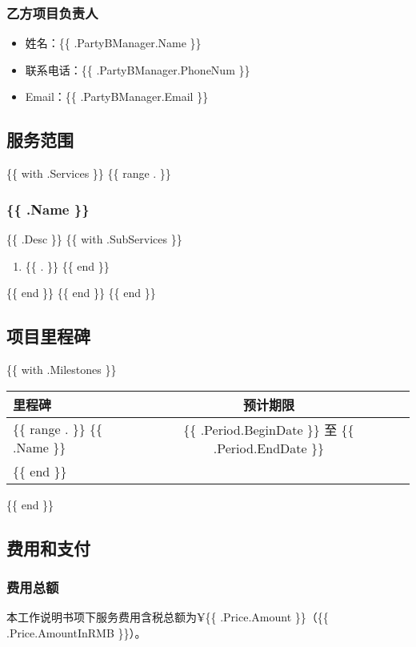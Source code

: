 \subsubsection{乙方项目负责人}
\begin{itemize}
  \item 姓名：\{\{ .PartyBManager.Name \}\}
  \item 联系电话：\{\{ .PartyBManager.PhoneNum \}\}
  \item Email：\{\{ .PartyBManager.Email \}\}
\end{itemize}

\clearpage

\subsection{服务范围}
\{\{ with .Services \}\}
\{\{ range . \}\}
\subsubsection{ \{\{ .Name \}\} }
{\{\{ .Desc \}\}}
\{\{ with .SubServices \}\}
\begin{enumerate}
\{\{ range . \}\}
  \item \{\{ . \}\}
\{\{ end \}\}
\end{enumerate}
\{\{ end \}\}
\{\{ end \}\}
\{\{ end \}\}

\clearpage

\subsection{项目里程碑}
\{\{ with .Milestones \}\}
\begin{tabular}{|l|c|r|}
  \hline
  \textbf{里程碑}& \textbf{预计期限}\\
  \hline
  \{\{ range . \}\}
  \{\{ .Name \}\}& \{\{ .Period.BeginDate \}\} 至 \{\{ .Period.EndDate \}\}\\
  \hline
  \{\{ end \}\}
\end{tabular}
\{\{ end \}\}

\clearpage

\subsection{费用和支付}

\subsubsection{费用总额}
本工作说明书项下服务费用含税总额为¥\{\{ .Price.Amount \}\}（\{\{ .Price.AmountInRMB \}\}）。

